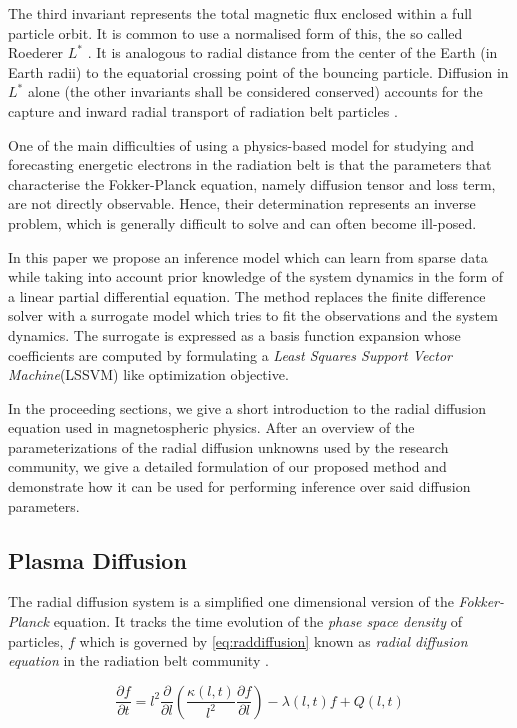 The third invariant represents the total magnetic flux enclosed within 
a full particle orbit. It is common to use a normalised form of this, the 
so called Roederer $L^{*}$ \citep{Roederer1970}. It is analogous to radial 
distance from the center of the Earth (in Earth radii) to the equatorial 
crossing point of the bouncing particle. Diffusion in $L^{*}$ alone 
(the other invariants shall be considered conserved) accounts for the
capture and inward radial transport of radiation belt particles 
\citep{Roederer1970,JGR:JGR4463}.

One of the main difficulties of using a physics-based model for studying and 
forecasting energetic electrons in the radiation belt is that the parameters 
that characterise the Fokker-Planck equation, namely diffusion tensor and loss term,
are not directly observable. Hence, their determination represents an inverse problem,
which is generally difficult to solve and can often become ill-posed.

In this paper we propose an inference model which can learn from sparse
data while taking into account prior knowledge of the system dynamics
in the form of a linear partial differential equation. The method replaces
the finite difference solver with a surrogate model which tries to fit
the observations and the system dynamics. The surrogate is expressed as
a basis function expansion whose coefficients are computed by formulating
a \emph{Least Squares Support Vector Machine}(LSSVM) like optimization
objective.

In the proceeding sections, we give a short introduction to the radial 
diffusion equation used in magnetospheric physics. After an overview of 
the parameterizations of the radial diffusion unknowns used by the research community, 
we give a detailed formulation of our proposed method and demonstrate 
how it can be used for performing inference over said diffusion parameters.

\subsection{Plasma Diffusion}

The radial diffusion system is a simplified one dimensional version of
the \emph{Fokker-Planck} equation. It tracks the time evolution of the
\emph{phase space density} of particles, $f$ which is governed by 
\cref{eq:raddiffusion} known as \emph{radial diffusion equation} in the 
radiation belt community \citep{JGRA:JGRA9345}.

\begin{equation}\label{eq:raddiffusion}
  \frac{\partial{f}}{\partial{t}} = l^2 \frac{\partial}{\partial{l}}\left( \frac{\kappa(l,
      t)}{l^{2}} \frac{\partial{f}}{\partial{l}} \right) - \lambda(l,
  t) f +  Q(l, t)
\end{equation}

